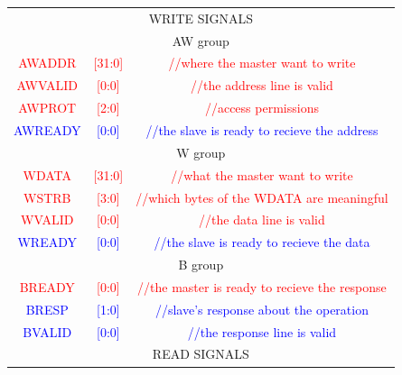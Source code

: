 \begin{tabular} {c c c}
  \hline
  \multicolumn{3}{c}{\Large{WRITE SIGNALS}} \\

  \multicolumn{3}{c}{{AW group}} \\
  \textcolor{Red}{\small{AWADDR}} & \textcolor{Red}{\small{[31:0]}} & \textcolor{Red}{\small{ //where the master want to write}} \\
  \textcolor{Red}{\small{AWVALID}} & \textcolor{Red}{\small{[0:0]}} & \textcolor{Red}{\small{ //the address line is valid}} \\
  \textcolor{Red}{\small{AWPROT}} & \textcolor{Red}{\small{[2:0]}} & \textcolor{Red}{\small{//access permissions}} \\
  \textcolor{Blue}{\small{AWREADY}} & \textcolor{Blue}{\small{[0:0]}} & \textcolor{Blue}{\small{//the slave is ready to recieve the address}} \\

  \multicolumn{3}{c}{{W group}} \\
  \textcolor{Red}{\small{WDATA}} & \textcolor{Red}{\small{[31:0]}} & \textcolor{Red}{\small{//what the master want to write}} \\
  \textcolor{Red}{\small{WSTRB}} & \textcolor{Red}{\small{[3:0]}} & \textcolor{Red}{\small{//which bytes of the WDATA are meaningful}} \\
  \textcolor{Red}{\small{WVALID}} & \textcolor{Red}{\small{[0:0]}} & \textcolor{Red}{\small{//the data line is valid}} \\
  \textcolor{Blue}{\small{WREADY}} & \textcolor{Blue}{\small{[0:0]}} & \textcolor{Blue}{\small{//the slave is ready to recieve the data}} \\

  \multicolumn{3}{c}{{B group}} \\
  \textcolor{Red}{\small{BREADY}} & \textcolor{Red}{\small{[0:0]}} & \textcolor{Red}{\small{//the master is ready to recieve the response}} \\
  \textcolor{Blue}{\small{BRESP}} & \textcolor{Blue}{\small{[1:0]}} & \textcolor{Blue}{\small{//slave’s response about the operation}} \\
  \textcolor{Blue}{\small{BVALID}} & \textcolor{Blue}{\small{[0:0]}} & \textcolor{Blue}{\small{//the response line is valid}} \\

  \hline
  \multicolumn{3}{c}{\Large{READ SIGNALS}} \\


\end{tabular}
